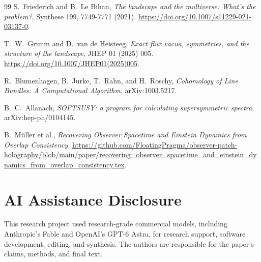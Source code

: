 \documentclass[11pt]{article}
\theoremstyle{remark}
\theoremstyle{plain}
\begin{document}
\begin{thebibliography}{99}
S.\ Friederich and B.\ Le Bihan,
\emph{The landscape and the multiverse: What's the problem?},
Synthese 199, 7749-7771 (2021).
\url{https://doi.org/10.1007/s11229-021-03137-0}.

T.\ W.\ Grimm and D.\ van de Heisteeg,
\emph{Exact flux vacua, symmetries, and the structure of the landscape},
JHEP 01 (2025) 005.
\url{https://doi.org/10.1007/JHEP01(2025)005}.

R.\ Blumenhagen, B.\ Jurke, T.\ Rahn, and H.\ Roschy,
\emph{Cohomology of Line Bundles: A Computational Algorithm},
arXiv:1003.5217.

B.\ C.\ Allanach,
\emph{SOFTSUSY: a program for calculating supersymmetric spectra},
arXiv:hep-ph/0104145.

B.~M\"uller et al.,
\emph{Recovering Observer Spacetime and Einstein Dynamics from Overlap Consistency}.
\url{https://github.com/FloatingPragma/observer-patch-holography/blob/main/paper/recovering_observer_spacetime_and_einstein_dynamics_from_overlap_consistency.tex}.

\end{thebibliography}

\section*{AI Assistance Disclosure}
This research project used research-grade commercial models, including
Anthropic's Fable and OpenAI's GPT-6 Astra, for research support, software
development, editing, and synthesis. The authors are responsible for the
paper's claims, methods, and final text.
\end{document}
